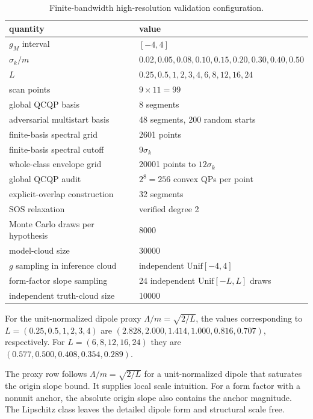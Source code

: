 \documentclass[12pt]{iopjournal}
\newenvironment{ruledtabular}{\centering}{}
\newcommand{\colrule}{\hline}
\begin{document}
\begin{table}[h]
\caption{Finite-bandwidth high-resolution validation configuration.}
\label{tab:scan-config}
\begin{ruledtabular}
\begin{tabular}{ll}
quantity & value \\
\colrule
$g_M$ interval & $[-4,4]$ \\
$\sigma_k/m$ & $0.02,0.05,0.08,0.10,0.15,0.20,0.30,0.40,0.50$ \\
$L$ & $0.25,0.5,1,2,3,4,6,8,12,16,24$ \\
scan points & $9\times11=99$ \\
global QCQP basis & 8 segments \\
adversarial multistart basis & 48 segments, 200 random starts \\
finite-basis spectral grid & 2601 points \\
finite-basis spectral cutoff & $9\sigma_k$ \\
whole-class envelope grid & 20001 points to $12\sigma_k$ \\
global QCQP audit & $2^8=256$ convex QPs per point \\
explicit-overlap construction & 32 segments \\
SOS relaxation & verified degree 2 \\
Monte Carlo draws per hypothesis & 8000 \\
model-cloud size & 30000 \\
$g$ sampling in inference cloud & independent $\mathrm{Unif}[-4,4]$ \\
form-factor slope sampling & 24 independent $\mathrm{Unif}[-L,L]$ draws \\
independent truth-cloud size & 10000 \\
\end{tabular}
\end{ruledtabular}
\end{table}

For the unit-normalized dipole proxy $\Lambda/m=\sqrt{2/L}$, the values
corresponding to $L=(0.25,0.5,1,2,3,4)$ are
$(2.828,2.000,1.414,1.000,0.816,0.707)$, respectively.  For
$L=(6,8,12,16,24)$ they are
$(0.577,0.500,0.408,0.354,0.289)$.

The proxy row follows $\Lambda/m=\sqrt{2/L}$ for a unit-normalized dipole that saturates the origin slope bound. It supplies local scale intuition. For a form factor with a nonunit anchor, the absolute origin slope also contains the anchor magnitude. The Lipschitz class leaves the detailed dipole form and structural scale free.
\end{document}
